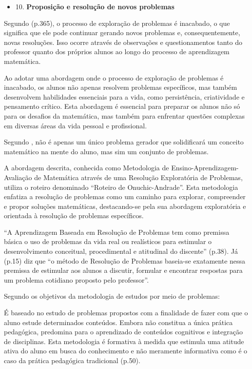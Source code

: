 \begin{itemize}
    \item 10. \textbf{Proposição e resolução de novos problemas}
\end{itemize}

Segundo  (p.365), o processo de exploração de problemas é inacabado, o que significa que ele pode continuar gerando novos problemas e, consequentemente, novas resoluções. Isso ocorre através de observações e questionamentos tanto do professor quanto dos próprios alunos ao longo do processo de aprendizagem matemática.

Ao adotar uma abordagem onde o processo de exploração de problemas é inacabado, os alunos não apenas resolvem problemas específicos, mas também desenvolvem habilidades essenciais para a vida, como persistência, criatividade e pensamento crítico. Esta abordagem é essencial para preparar os alunos não só para os desafios da matemática, mas também para enfrentar questões complexas em diversas áreas da vida pessoal e profissional.

Segundo , não é apenas um único problema gerador que solidificará um conceito matemático na mente do aluno, mas sim um conjunto de problemas.

A abordagem descrita, conhecida como Metodologia de Ensino-Aprendizagem-Avaliação de Matemática através de uma Resolução Exploratória de Problemas, utiliza o roteiro denominado ``Roteiro de Onuchic-Andrade''. Esta metodologia enfatiza a resolução de problemas como um caminho para explorar, compreender e propor soluções matemáticas, destacando-se pela sua abordagem exploratória e orientada à resolução de problemas específicos.

``A Aprendizagem Baseada em Resolução de Problemas tem como premissa básica o uso de problemas da vida real ou realísticos para estimular o desenvolvimento conceitual, procedimental e atitudinal do discente''  (p.38). Já  (p.15) diz que ``o método de Resolução de Problemas baseia-se exatamente nessa premissa de estimular aos alunos a discutir, formular e encontrar respostas para um problema cotidiano proposto pelo professor''.

Segundo  os objetivos da metodologia de estudos por meio de problemas:

\begin{citacao}
    É baseado no estudo de problemas propostos com a finalidade de fazer com que o aluno estude determinados conteúdos. Embora não constitua a única prática pedagógica, predomina para o aprendizado de conteúdos cognitivos e integração de disciplinas. Esta metodologia é formativa à medida que estimula uma atitude ativa do aluno em busca do conhecimento e não meramente informativa como é o caso da prática pedagógica tradicional \cite{TANGERINO2017} (p.50).
\end{citacao}

